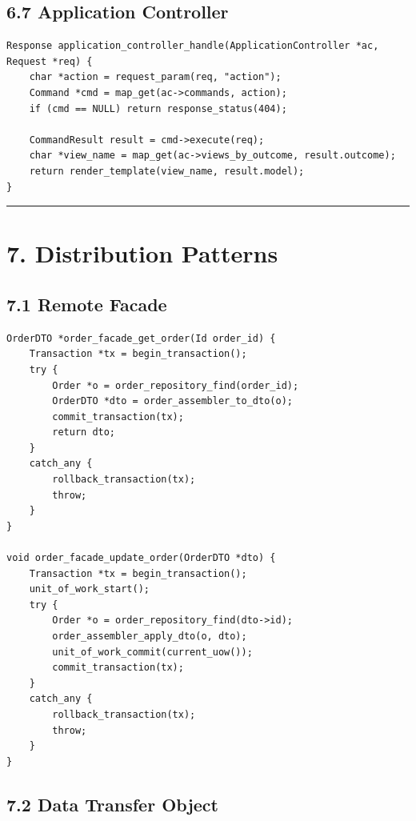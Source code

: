 \documentclass[11pt]{article}
\begin{document}
\subsection{6.7 Application Controller}\label{application-controller}

\begin{verbatim}
Response application_controller_handle(ApplicationController *ac, Request *req) {
    char *action = request_param(req, "action");
    Command *cmd = map_get(ac->commands, action);
    if (cmd == NULL) return response_status(404);

    CommandResult result = cmd->execute(req);
    char *view_name = map_get(ac->views_by_outcome, result.outcome);
    return render_template(view_name, result.model);
}
\end{verbatim}

\begin{center}\rule{0.5\linewidth}{0.5pt}\end{center}

\section{7. Distribution Patterns}\label{distribution-patterns}

\subsection{7.1 Remote Facade}\label{remote-facade}

\begin{verbatim}
OrderDTO *order_facade_get_order(Id order_id) {
    Transaction *tx = begin_transaction();
    try {
        Order *o = order_repository_find(order_id);
        OrderDTO *dto = order_assembler_to_dto(o);
        commit_transaction(tx);
        return dto;
    }
    catch_any {
        rollback_transaction(tx);
        throw;
    }
}

void order_facade_update_order(OrderDTO *dto) {
    Transaction *tx = begin_transaction();
    unit_of_work_start();
    try {
        Order *o = order_repository_find(dto->id);
        order_assembler_apply_dto(o, dto);
        unit_of_work_commit(current_uow());
        commit_transaction(tx);
    }
    catch_any {
        rollback_transaction(tx);
        throw;
    }
}
\end{verbatim}

\subsection{7.2 Data Transfer Object}\label{data-transfer-object}
\end{document}
